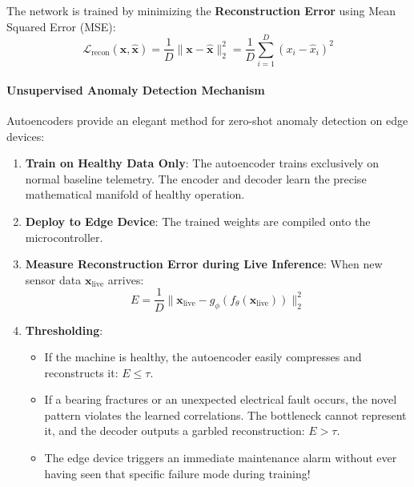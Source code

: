 The network is trained by minimizing the \textbf{Reconstruction Error} using Mean Squared Error (MSE):
\begin{equation}
\mathcal{L}_{\text{recon}}(\mathbf{x}, \hat{\mathbf{x}}) = \frac{1}{D} \|\mathbf{x} - \hat{\mathbf{x}}\|_2^2 = \frac{1}{D} \sum_{i=1}^D (x_i - \hat{x}_i)^2\label{eq:recon_loss}
\end{equation}

\paragraph{Unsupervised Anomaly Detection Mechanism}
Autoencoders provide an elegant method for zero-shot anomaly detection on edge devices:
\begin{enumerate}
    \item \textbf{Train on Healthy Data Only}: The autoencoder trains exclusively on normal baseline telemetry. The encoder and decoder learn the precise mathematical manifold of healthy operation.
    \item \textbf{Deploy to Edge Device}: The trained weights are compiled onto the microcontroller.
    \item \textbf{Measure Reconstruction Error during Live Inference}: When new sensor data $\mathbf{x}_{\text{live}}$ arrives:
    \begin{equation*}
    E = \frac{1}{D} \|\mathbf{x}_{\text{live}} - g_\phi(f_\theta(\mathbf{x}_{\text{live}}))\|_2^2
    \end{equation*}
    \item \textbf{Thresholding}:
    \begin{itemize}
        \item If the machine is healthy, the autoencoder easily compresses and reconstructs it: $E \le \tau$.
        \item If a bearing fractures or an unexpected electrical fault occurs, the novel pattern violates the learned correlations. The bottleneck cannot represent it, and the decoder outputs a garbled reconstruction: $E > \tau$.
        \item The edge device triggers an immediate maintenance alarm without ever having seen that specific failure mode during training!
    \end{itemize}
\end{enumerate}

